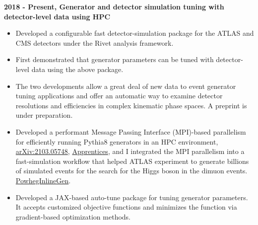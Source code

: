 \noindent\textbf{2018 - Present, Generator and detector simulation tuning with detector-level data using HPC}
\begin{itemize}
    \item Developed a configurable fast detector-simulation package for the ATLAS and CMS detectors under the Rivet analysis framework.
    \item First demonstrated that generator parameters can be tuned with detector-level data using the above package.
    \item The two developments allow a great deal of new data to event generator tuning applications and offer an automatic way to examine detector resolutions and efficiencies in complex kinematic phase spaces. A preprint is under preparation.
    \item Developed a performant Message Passing Interface (MPI)-based parallelism for efficiently running Pythia8 generators in an HPC environment, \href{https://arxiv.org/abs/2103.05748}{arXiv:2103.05748}, \href{https://github.com/HEPonHPC/apprentice}{Apprentices}, and I integrated the MPI parallelism into a fast-simulation workflow that helped ATLAS experiment to generate billions of simulated events for the search for the Higgs boson in the dimuon events. \href{https://gitlab.cern.ch/xju/powheginlinegen}{PowhegInlineGen}.
    
    \item Developed a JAX-based auto-tune package for tuning generator parameters. It accepts customized objective functions and minimizes the function via gradient-based optimization methods.
\end{itemize}


